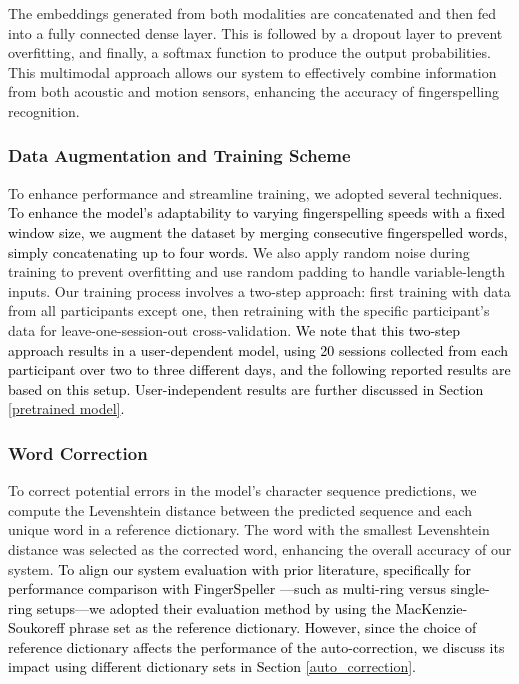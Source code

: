 The embeddings generated from both modalities are concatenated and then fed into a fully connected dense layer. This is followed by a dropout layer to prevent overfitting, and finally, a softmax function to produce the output probabilities. This multimodal approach allows our system to effectively combine information from both acoustic and motion sensors, enhancing the accuracy of fingerspelling recognition.

\subsubsection{Data Augmentation and Training Scheme}
To enhance performance and streamline training, we adopted several techniques. \textcolor{black}{To enhance the model's adaptability to varying fingerspelling speeds with a fixed window size, we augment the dataset by merging consecutive fingerspelled words, simply concatenating up to four words.} We also apply random noise during training to prevent overfitting and use random padding to handle variable-length inputs. Our training process involves a two-step approach: first training with data from all participants except one, then retraining with the specific participant's data for leave-one-session-out cross-validation. \textcolor{black}{We note that this two-step approach results in a user-dependent model, using 20 sessions collected from each participant over two to three different days, and the following reported results are based on this setup. User-independent results are further discussed in Section \ref{pretrained model}. }

\subsubsection{Word Correction}
To correct potential errors in the model's character sequence predictions, we compute the Levenshtein distance \cite{Levenshtein1965BinaryCC} between the predicted sequence and each unique word in a reference dictionary. The word with the smallest Levenshtein distance was selected as the corrected word, enhancing the overall accuracy of our system. \textcolor{black}{To align our system evaluation with prior literature, specifically for performance comparison with FingerSpeller \cite{martin2023fingerspeller}—such as multi-ring versus single-ring setups—we adopted their evaluation method by using the MacKenzie-Soukoreff phrase set \cite{mackenzie2003phrase} as the reference dictionary.}
\textcolor{black}{However, since the choice of reference dictionary affects the performance of the auto-correction, we discuss its impact using different dictionary sets in Section \ref{auto_correction}.}



